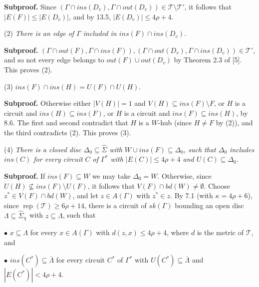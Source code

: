 \textbf{Subproof.} Since $(\Gamma \cap ins(D_v), \Gamma \cap out(D_v)) \in \mathscr{T} \setminus \mathscr{T}'$, it follows that $|E(F)| \le |E(D_v)|$, and by 13.5, $|E(D_v)| \le 4\rho + 4$.

\hspace*{12pt}(2) \textit{There is an edge of $\Gamma$ included in $ins(F) \cap ins(D_v)$.}

\textbf{Subproof.} $(\Gamma \cap out(F), \Gamma \cap ins(F)), (\Gamma \cap out(D_v), \Gamma \cap ins(D_v)) \in \mathscr{T}'$, and so not every edge belongs to $out(F) \cup out(D_v)$ by Theorem 2.3 of [5]. This proves (2).

\hspace*{12pt}(3) $ins(F) \cap ins(H) = U(F) \cap U(H)$.

\textbf{Subproof.} Otherwise either $|V(H)| = 1$ and $V(H) \subseteq ins(F) \setminus F$, or $H$ is a circuit and $ins(H) \subseteq ins(F)$, or $H$ is a circuit and $ins(F) \subseteq ins(H)$, by 8.6. The first and second contradict that $H$ is a $W$-hub (since $H \ne F$ by (2)), and the third contradicts (2). This proves (3).

\hspace*{12pt}(4) \textit{There is a closed disc $\Delta_0 \subseteq \hat{\Sigma}$ with $W \cup ins(F) \subseteq \Delta_0$, such that $\Delta_0$ includes $ins(C)$ for every circuit $C$ of $\Gamma^*$ with $|E(C)| \le 4\rho + 4$ and $U(C) \subseteq \Delta_0$.}

\textbf{Subproof.} If $ins(F) \subseteq W$ we may take $\Delta_0 = W$. Otherwise, since $U(H) \nsubseteq ins(F) \setminus U(F)$, it follows that $V(F) \cap bd(W) \ne \emptyset$. Choose $z^* \in V(F) \cap bd(W)$, and let $z \in A(\Gamma)$ with $z^* \in z$. By 7.1 (with $\kappa = 4\rho + 6$), since $\operatorname{rep}(\mathscr{T}) \ge 6\rho + 14$, there is a circuit of $sk(\Gamma)$ bounding an open disc $\Lambda \subseteq \hat{\Sigma}_\chi$ with $z \subseteq \Lambda$, such that

\hspace*{12pt}$\bullet$ $x \subseteq \Lambda$ for every $x \in A(\Gamma)$ with $d(z, x) \le 4\rho + 4$, where $d$ is the metric of $\mathscr{T}$, and

\hspace*{12pt}$\bullet$ $ins(C^*) \subseteq \bar{\Lambda}$ for every circuit $C^*$ of $\Gamma^*$ with $U(C^*) \subseteq \bar{\Lambda}$ and $|E(C^*)| < 4\rho + 4$.

